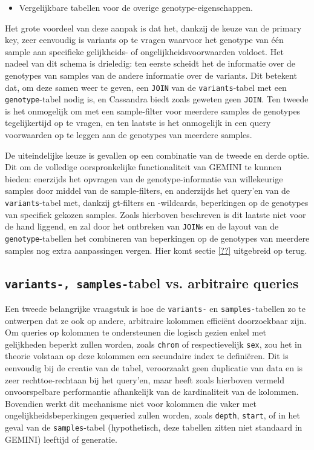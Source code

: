 \begin{itemize}
\begin{itemize}
\item Vergelijkbare tabellen voor de overige genotype-eigenschappen.

\end{itemize}

Het grote voordeel van deze aanpak is dat het, dankzij de keuze van de primary key, zeer eenvoudig is variants op te vragen waarvoor het genotype van \'e\'en sample aan specifieke gelijkheids- of ongelijkheidsvoorwaarden voldoet. Het nadeel van dit schema is drieledig: ten eerste scheidt het de informatie over de genotypes van samples van de andere informatie over de variants. Dit betekent dat, om deze samen weer te geven, een \texttt{JOIN} van de \texttt{variants}-tabel met een \texttt{genotype}-tabel nodig is, en Cassandra biedt zoals geweten geen \texttt{JOIN}. Ten tweede is het onmogelijk om met een sample-filter voor meerdere samples de genotypes tegelijkertijd op te vragen, en ten laatste is het onmogelijk in een query voorwaarden op te leggen aan de genotypes van meerdere samples.


\end{itemize}

De uiteindelijke keuze is gevallen op een combinatie van de tweede en derde optie. Dit om de volledige oorspronkelijke functionaliteit van GEMINI te kunnen bieden: enerzijds het opvragen van de genotype-informatie van willekeurige samples door middel van de sample-filters, en anderzijds het query'en van de \texttt{variants}-tabel met, dankzij gt-filters en -wildcards, beperkingen op de genotypes van specifiek gekozen samples. Zoals hierboven beschreven is dit laatste niet voor de hand liggend, en zal door het ontbreken van \texttt{JOIN}s en de layout van de \texttt{genotype}-tabellen het combineren van beperkingen op de genotypes van meerdere samples nog extra aanpassingen vergen. Hier komt sectie \ref{??} uitgebreid op terug.

\subsection{\texttt{variants-, samples-}tabel vs. arbitraire queries}

Een tweede belangrijke vraagstuk is hoe de \texttt{variants-} en \texttt{samples-}tabellen zo te ontwerpen dat ze ook op andere, arbitraire kolommen effici\"ent doorzoekbaar zijn.\\
Om queries op kolommen te ondersteunen die logisch gezien enkel met gelijkheden beperkt zullen worden, zoals \texttt{chrom} of respectievelijk \texttt{sex}, zou het in theorie volstaan op deze kolommen een secundaire index te defini\"eren. Dit is eenvoudig bij de creatie van de tabel, veroorzaakt geen duplicatie van data en is zeer rechttoe-rechtaan bij het query'en, maar heeft zoals hierboven vermeld onvoorspelbare performantie afhankelijk van de kardinaliteit van de kolommen. Bovendien werkt dit mechanisme niet voor kolommen die vaker met ongelijkheidsbeperkingen gequeried zullen worden, zoals \texttt{depth}, \texttt{start}, of in het geval van de \texttt{samples}-tabel (hypothetisch, deze tabellen zitten niet standaard in GEMINI) leeftijd of generatie.\\

